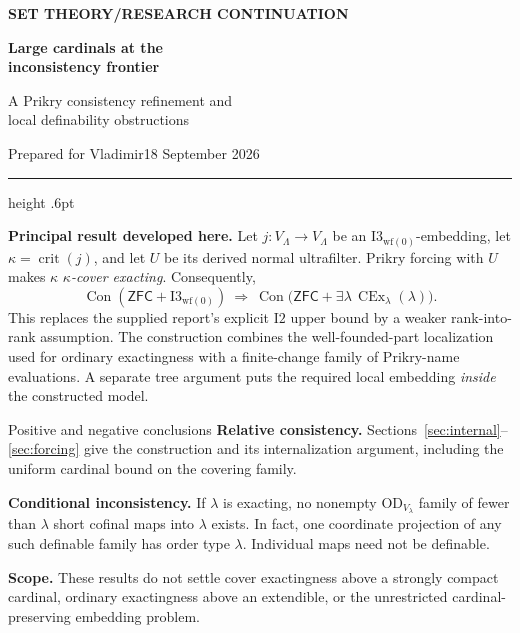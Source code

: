 \documentclass[11pt,letterpaper]{article}
\theoremstyle{definition}
\newcommand{\ZFC}{\mathsf{ZFC}}
\newcommand{\OD}{\mathrm{OD}}
\newcommand{\CEx}{\operatorname{CEx}}
\newcommand{\Con}{\operatorname{Con}}
\newcommand{\crit}{\operatorname{crit}}
\newcommand{\Itwo}{\mathrm{I2}}
\newcommand{\Iwf}{\mathrm{I3}_{\mathrm{wf}(0)}}
\begin{document}
\thispagestyle{empty}
{\sffamily\bfseries\small\color{Olive}SET THEORY\quad /\quad RESEARCH CONTINUATION}

\vspace{13pt}
{\fontsize{28}{31}\selectfont\bfseries\color{Forest}Large cardinals at the\\ inconsistency frontier\par}
\vspace{10pt}
{\fontsize{14}{18}\selectfont A Prikry consistency refinement and\\ local definability obstructions\par}
\vspace{14pt}
{\color{Muted}Prepared for Vladimir\hfill 18 September 2026\par}
\vspace{3pt}
{\color{Sage}\hrule height .6pt}
\vspace{12pt}

\textbf{Principal result developed here.} Let $j:V_\Lambda\to V_\Lambda$ be an
$\Iwf$-embedding, let $\kappa=\crit(j)$, and let $U$ be its derived normal
ultrafilter. Prikry forcing with $U$ makes $\kappa$ \emph{$\kappa$-cover exacting}.
Consequently,
\[
 \boxed{\quad
 \Con(\ZFC+\Iwf)\ \Longrightarrow\
 \Con\bigl(\ZFC+\exists\lambda\,\CEx_\lambda(\lambda)\bigr).
 \quad}
\]
This replaces the supplied report's explicit $\Itwo$ upper bound by a weaker
rank-into-rank assumption. The construction combines the well-founded-part
localization used for ordinary exactingness with a finite-change family of
Prikry-name evaluations. A separate tree argument puts the required local
embedding \emph{inside} the constructed model.

\begin{assessment}{Positive and negative conclusions}
\textbf{Relative consistency.} Sections~\ref{sec:internal}--\ref{sec:forcing}
give the construction and its internalization argument, including the
uniform cardinal bound on the covering family.

\textbf{Conditional inconsistency.} If $\lambda$ is exacting, no nonempty
$\OD_{V_\lambda}$ family of fewer than $\lambda$ short cofinal maps into
$\lambda$ exists. In fact, one coordinate projection of any such definable
family has order type $\lambda$. Individual maps need not be definable.

\textbf{Scope.} These results do not settle cover exactingness above a
strongly compact cardinal, ordinary exactingness above an extendible, or the
unrestricted cardinal-preserving embedding problem.
\end{assessment}
\end{document}
